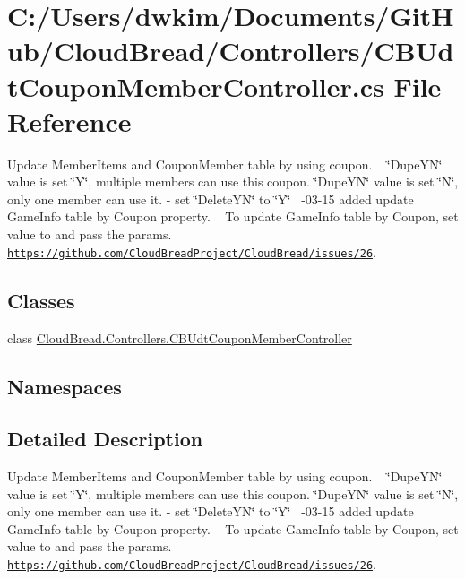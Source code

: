 \hypertarget{a00156}{}\section{C\+:/\+Users/dwkim/\+Documents/\+Git\+Hub/\+Cloud\+Bread/\+Controllers/\+C\+B\+Udt\+Coupon\+Member\+Controller.cs File Reference}
\label{a00156}


Update Member\+Items and Coupon\+Member table by using coupon. ~\newline
\char`\"{}\+Dupe\+Y\+N\char`\"{} value is set \char`\"{}\+Y\char`\"{}, multiple members can use this coupon. \char`\"{}\+Dupe\+Y\+N\char`\"{} value is set \char`\"{}\+N\char`\"{}, only one member can use it. -\/ set \char`\"{}\+Delete\+Y\+N\char`\"{} to \char`\"{}\+Y\char`\"{} ~-\/03-\/15 added update Game\+Info table by Coupon property. ~\newline
To update Game\+Info table by Coupon, set  value to  and pass the params. \href{https://github.com/CloudBreadProject/CloudBread/issues/26}{\tt https\+://github.\+com/\+Cloud\+Bread\+Project/\+Cloud\+Bread/issues/26}.  


\subsection*{Classes}
\begin{DoxyCompactItemize}
\item 
class \hyperlink{a00043}{Cloud\+Bread.\+Controllers.\+C\+B\+Udt\+Coupon\+Member\+Controller}
\end{DoxyCompactItemize}
\subsection*{Namespaces}
\begin{DoxyCompactItemize}
\end{DoxyCompactItemize}


\subsection{Detailed Description}
Update Member\+Items and Coupon\+Member table by using coupon. ~\newline
\char`\"{}\+Dupe\+Y\+N\char`\"{} value is set \char`\"{}\+Y\char`\"{}, multiple members can use this coupon. \char`\"{}\+Dupe\+Y\+N\char`\"{} value is set \char`\"{}\+N\char`\"{}, only one member can use it. -\/ set \char`\"{}\+Delete\+Y\+N\char`\"{} to \char`\"{}\+Y\char`\"{} ~-\/03-\/15 added update Game\+Info table by Coupon property. ~\newline
To update Game\+Info table by Coupon, set  value to  and pass the params. \href{https://github.com/CloudBreadProject/CloudBread/issues/26}{\tt https\+://github.\+com/\+Cloud\+Bread\+Project/\+Cloud\+Bread/issues/26}. 


